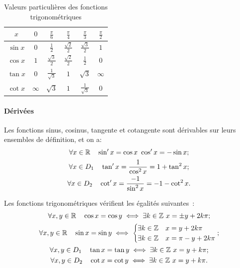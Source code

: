 %
\renewcommand{\arraystretch}{2.2}
\begin{table}
  \centering
  \begin{tabular}{|c|c|c|c|c|c|}
    \hline
    \(\displaystyle x\)& \(\displaystyle 0\)&\(\displaystyle \frac{\pi}{6}\)&\(\displaystyle \frac{\pi}{4}\)&\(\displaystyle \frac{\pi}{3}\)&\(\displaystyle \frac{\pi}{2}\)\\ \hline
    \(\displaystyle \sin x\) &\(\displaystyle  0\) &\(\displaystyle  \frac{1}{2}\) &\(\displaystyle  \frac{\sqrt{2}}{2}\) & \(\displaystyle \frac{\sqrt{3}}{2}\) &\(\displaystyle  1 \)\\ \hline
    \(\displaystyle \cos x\) &\(\displaystyle  1 \)&\(\displaystyle \frac{\sqrt{3}}{2}\) & \(\displaystyle \frac{\sqrt{2}}{2}\) & \(\displaystyle \frac{1}{2}\) & \(\displaystyle 0\) \\ \hline
    \(\displaystyle \tan x\) & \(\displaystyle  0 \)&\(\displaystyle \frac{1}{\sqrt{3}}\) & \(\displaystyle 1\) & \(\displaystyle \sqrt{3}\) & \(\displaystyle \infty\) \\ \hline
    \(\displaystyle \cot x\) & \(\displaystyle \infty\) & \(\displaystyle \sqrt{3}\) &\(\displaystyle  1\) & \(\displaystyle \frac{1}{\sqrt{3}}\) &\(\displaystyle  0\)\\ \hline
  \end{tabular}
  \caption{Valeurs particulières des fonctions trigonométriques}
  \label{tab:valeurpart}
\end{table}
\renewcommand{\arraystretch}{1}
\paragraph{Dérivées}
Les fonctions sinus, cosinus, tangente et cotangente sont dérivables sur leurs ensembles de définition, et on a:
\begin{gather}
\forall x \in \mathbb{R} \quad \sin'x=\cos x \ \cos'x=-\sin x; \\
\forall x \in D_1 \quad \tan'x=\frac{1}{\cos^2 x}=1+\tan^2 x; \\
\forall x \in D_2 \quad \cot'x=\frac{-1}{\sin^2 x}=-1-\cot^2 x.
\end{gather}
\begin{prop}
  Les fonctions trigonométriques vérifient les égalités suivantes~:
  \begin{gather}
    \forall x, y \in \R \quad \cos x = \cos y \iff \exists k \in \Z \ x=\pm y + 2k\pi;\\
    \forall x, y \in \R \quad \sin x = \sin y \iff \begin{cases} \exists k \in \Z & x = y + 2 k \pi \\ \exists k \in \Z & x = \pi - y + 2 k \pi\end{cases}; \\
    \forall x, y \in D_1 \quad \tan x = \tan y \iff \exists k \in \Z \ x = y + k \pi;\\
    \forall x, y \in D_2 \quad \cot x = \cot y \iff \exists k \in \Z \ x = y + k \pi.
  \end{gather}
\end{prop}

